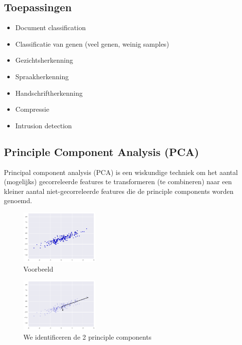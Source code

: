 \documentclass{article}
\begin{document}
\subsection{Toepassingen}

\begin{itemize}
    \item Document classification
    \item Classificatie van genen (veel genen, weinig samples)
    \item Gezichtsherkenning
    \item Spraakherkenning
    \item Handschriftherkenning
    \item Compressie
    \item Intrusion detection
\end{itemize}

\subsection{Principle Component Analysis (PCA)}

Principal component analysis (PCA) is een wiskundige techniek om het aantal (mogelijks)
gecorreleerde features te transformeren (te combineren) naar een kleiner aantal niet-gecorreleerde features
die de principle components worden genoemd.

\begin{figure}[H]
    \centering
    \includegraphics[width=0.35\textwidth]{pca1.png}
    \caption{Voorbeeld}
\end{figure}

\begin{figure}[H]
    \centering
    \includegraphics[width=0.35\textwidth]{pca2.png}
    \caption{We identificeren de 2 principle components}
\end{figure}
\end{document}
